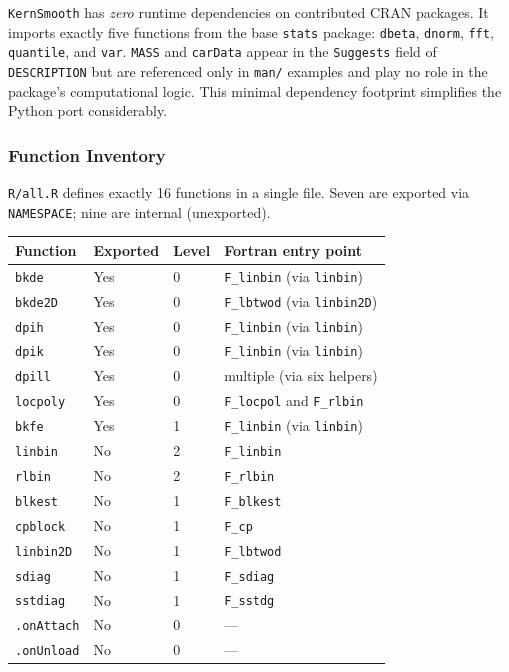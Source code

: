 \documentclass[12pt,a4paper]{article}
\begin{document}
\texttt{KernSmooth} has \emph{zero} runtime dependencies on contributed CRAN packages. It imports exactly five functions from the base \texttt{stats} package: \texttt{dbeta}, \texttt{dnorm}, \texttt{fft}, \texttt{quantile}, and \texttt{var}. \texttt{MASS} and \texttt{carData} appear in the \texttt{Suggests} field of \texttt{DESCRIPTION} but are referenced only in \texttt{man/} examples and play no role in the package's computational logic. This minimal dependency footprint simplifies the Python port considerably.

\subsubsection{Function Inventory}

\texttt{R/all.R} defines exactly 16 functions in a single file. Seven are exported via \texttt{NAMESPACE}; nine are internal (unexported).

\begin{center}
\begin{tabular}{llll}
\toprule
Function & Exported & Level & Fortran entry point \\
\midrule
\texttt{bkde}      & Yes & 0 & \texttt{F\_linbin} (via \texttt{linbin}) \\
\texttt{bkde2D}    & Yes & 0 & \texttt{F\_lbtwod} (via \texttt{linbin2D}) \\
\texttt{dpih}      & Yes & 0 & \texttt{F\_linbin} (via \texttt{linbin}) \\
\texttt{dpik}      & Yes & 0 & \texttt{F\_linbin} (via \texttt{linbin}) \\
\texttt{dpill}     & Yes & 0 & multiple (via six helpers) \\
\texttt{locpoly}   & Yes & 0 & \texttt{F\_locpol} and \texttt{F\_rlbin} \\
\texttt{bkfe}      & Yes & 1 & \texttt{F\_linbin} (via \texttt{linbin}) \\
\texttt{linbin}    & No  & 2 & \texttt{F\_linbin} \\
\texttt{rlbin}     & No  & 2 & \texttt{F\_rlbin} \\
\texttt{blkest}    & No  & 1 & \texttt{F\_blkest} \\
\texttt{cpblock}   & No  & 1 & \texttt{F\_cp} \\
\texttt{linbin2D}  & No  & 1 & \texttt{F\_lbtwod} \\
\texttt{sdiag}     & No  & 1 & \texttt{F\_sdiag} \\
\texttt{sstdiag}   & No  & 1 & \texttt{F\_sstdg} \\
\texttt{.onAttach} & No  & 0 & --- \\
\texttt{.onUnload} & No  & 0 & --- \\
\bottomrule
\end{tabular}
\end{center}
\end{document}

